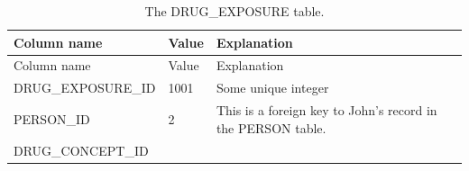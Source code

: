 \documentclass[11pt]{book}
\theoremstyle{definition}
\theoremstyle{definition}
\theoremstyle{definition}
\theoremstyle{remark}
\begin{document}
\begin{longtable}[]{@{}lll@{}}
\caption{\label{tab:johnDrug} The DRUG\_EXPOSURE table.}\tabularnewline
\toprule
\begin{minipage}[b]{0.28\columnwidth}\raggedright\strut
Column name\strut
\end{minipage} & \begin{minipage}[b]{0.16\columnwidth}\raggedright\strut
Value\strut
\end{minipage} & \begin{minipage}[b]{0.48\columnwidth}\raggedright\strut
Explanation\strut
\end{minipage}\tabularnewline
\midrule
\endfirsthead
\toprule
\begin{minipage}[b]{0.28\columnwidth}\raggedright\strut
Column name\strut
\end{minipage} & \begin{minipage}[b]{0.16\columnwidth}\raggedright\strut
Value\strut
\end{minipage} & \begin{minipage}[b]{0.48\columnwidth}\raggedright\strut
Explanation\strut
\end{minipage}\tabularnewline
\midrule
\endhead
\begin{minipage}[t]{0.28\columnwidth}\raggedright\strut
DRUG\_EXPOSURE\_ID\strut
\end{minipage} & \begin{minipage}[t]{0.16\columnwidth}\raggedright\strut
1001\strut
\end{minipage} & \begin{minipage}[t]{0.48\columnwidth}\raggedright\strut
Some unique integer\strut
\end{minipage}\tabularnewline
\begin{minipage}[t]{0.28\columnwidth}\raggedright\strut
PERSON\_ID\strut
\end{minipage} & \begin{minipage}[t]{0.16\columnwidth}\raggedright\strut
2\strut
\end{minipage} & \begin{minipage}[t]{0.48\columnwidth}\raggedright\strut
This is a foreign key to John's record in the PERSON table.\strut
\end{minipage}\tabularnewline
\begin{minipage}[t]{0.28\columnwidth}\raggedright\strut
DRUG\_CONCEPT\_ID\strut
\end{minipage} & \begin{minipage}[t]{0.16\columnwidth}\raggedright\strut

\end{minipage}
\end{longtable}
\end{document}
